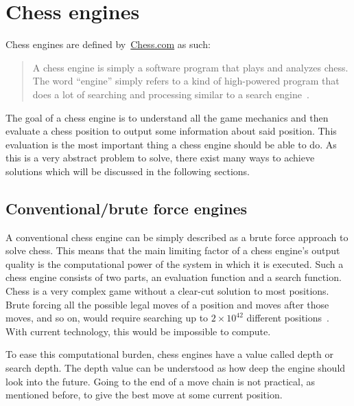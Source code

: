 \section{Chess engines}\label{sec:chess-engines}

Chess engines are defined by~\url{Chess.com} as such:

\begin{quote}
    A chess engine is simply a software program that plays and analyzes chess.
    The word “engine” simply refers to a kind of high-powered program that does a
    lot of searching and processing similar to a search engine~\cite{chess-com-chess-engines}.
\end{quote}

The goal of a chess engine is to understand all the game mechanics and then evaluate a chess position to output some
information about said position.
This evaluation is the most important thing a chess engine should be able to do.
As this is a very abstract problem to solve, there exist many ways to achieve solutions which will be discussed in
the following sections.



\subsection{Conventional/brute force engines}\label{subsec:conventional-engines}

A conventional chess engine can be simply described as a brute force approach to solve chess.
This means that the main limiting factor of a chess engine's output quality is the computational power of the system in
which it is executed.
Such a chess engine consists of two parts, an evaluation function and a search function.
Chess is a very complex game without a clear-cut solution to most positions.
Brute forcing all the possible legal moves of a position and moves after those moves, and so on, would require searching
up to \( 2 \times 10^{42} \) different positions~\cite{steinerberger2014}.
With current technology, this would be impossible to compute.

To ease this computational burden, chess engines have a value called depth or search depth.
The depth value can be understood as how deep the engine should look into the future.
Going to the end of a move chain is not practical, as mentioned before, to give the best move at some current position.

